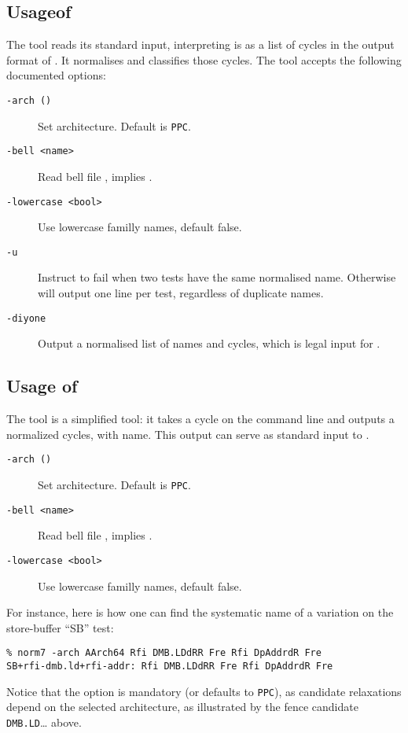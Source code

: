 \subsection{Usage\label{classify:usage}of \classify}
The tool \classify{} reads its standard input, interpreting is as
a list of cycles in the output format of \mcycles.
It normalises and classifies those cycles.
The tool \classify{} accepts the following documented options:
\begin{description}
\item[{\tt -arch (\allarch)}] Set architecture. Default is \texttt{PPC}.
\item[{\tt -bell <name>}]  Read bell file ,
implies  .
\item[{\tt -lowercase <bool>}] Use lowercase familly names, default false.
\item[{\tt -u}] Instruct \classify{} to fail when two tests have the same
normalised name. Otherwise \classify{} will output one line per test,
regardless of duplicate names.
\item[{\tt -diyone}] Output a normalised list of names and cycles,
which is legal input for \diyone.
\end{description}

\subsection{Usage\label{norm:usage} of \norm}
The tool \norm{} is a simplified \classify{} tool: it takes
a cycle on the command line and outputs a normalized cycles, with name.
This output can serve as standard input to \diyone.

\begin{description}
\item[{\tt -arch (\allarch)}] Set architecture. Default is \texttt{PPC}.
\item[{\tt -bell <name>}]  Read bell file , implies .
\item[{\tt -lowercase <bool>}] Use lowercase familly names, default false.
\end{description}

For instance, here is how one can find the systematic name of a variation
on the store-buffer ``\textsf{SB}'' test:
\begin{verbatim}
% norm7 -arch AArch64 Rfi DMB.LDdRR Fre Rfi DpAddrdR Fre
SB+rfi-dmb.ld+rfi-addr: Rfi DMB.LDdRR Fre Rfi DpAddrdR Fre
\end{verbatim}
Notice that the option  is mandatory (or defaults to \texttt{PPC}),
as  candidate relaxations depend on the selected architecture, as illustrated
by the fence candidate \texttt{DMB.LD}\ldots{} above.

\endinput
